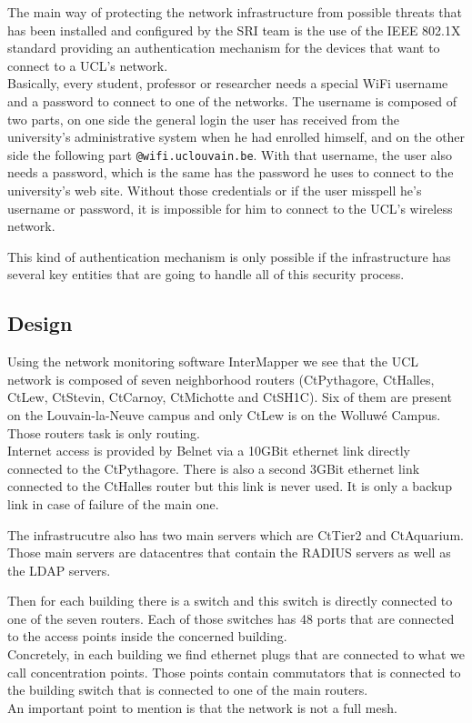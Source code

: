 The main way of protecting the network infrastructure from possible threats that has been installed and configured by the SRI team is the use of the IEEE 802.1X standard providing an authentication mechanism for the devices that want to connect to a UCL's network.\\
Basically, every student, professor or researcher needs a special WiFi username and a password to connect to one of the networks. The username is composed of two parts, on one side the general login the user has received from the university's administrative system when he had enrolled himself, and on the other side the following part \texttt{@wifi.uclouvain.be}. With that username, the user also needs a password, which is the same has the password he uses to connect to the university's web site. Without those credentials or if the user misspell he's username or password, it is impossible for him to connect to the UCL's wireless network.

This kind of authentication mechanism is only possible if the infrastructure has several key entities that are going to handle all of this security process.

\subsection{Design}
Using the network monitoring software InterMapper\cite{intermapper} we see that the UCL network is composed of seven neighborhood routers (CtPythagore, CtHalles, CtLew, CtStevin, CtCarnoy, CtMichotte and CtSH1C). Six of them are present on the Louvain-la-Neuve campus and only CtLew is on the Wolluwé Campus. Those routers task is only routing.\\

Internet access is provided by Belnet via a 10GBit ethernet link directly connected to the CtPythagore. There is also a second 3GBit ethernet link connected to the CtHalles router but this link is never used. It is only a backup link in case of failure of the main one.

The infrastrucutre also has two main servers which are CtTier2 and CtAquarium. Those main servers are datacentres that contain the RADIUS servers as well as the LDAP servers.

Then for each building there is a switch and this switch is directly connected to one of the seven routers. Each of those switches has 48 ports that are connected to the access points inside the concerned building.\\
Concretely, in each building we find ethernet plugs that are connected to what we call concentration points. Those points contain commutators that is connected to the building switch that is connected to one of the main routers.\\
An important point to mention is that the network is not a full mesh.

